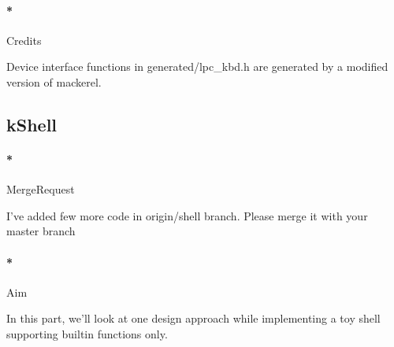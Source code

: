 \documentclass[]{article}
\newenvironment{Shaded}{}{}
\newcommand{\ExtensionTok}[1]{{#1}}
\newcommand{\NormalTok}[1]{{#1}}
\let\oldparagraph\paragraph
\renewcommand{\paragraph}[1]{\oldparagraph{#1}\mbox{}}
\begin{document}
\paragraph*{Credits}\label{credits}

Device interface functions in generated/lpc\_kbd.h are generated by a
modified version of mackerel.

\subsection{kShell}\label{kshell}

\paragraph*{MergeRequest}\label{mergerequest-3}

I've added few more code in origin/shell branch. Please merge it with
your master branch

\begin{Shaded}
\end{Shaded}

\paragraph*{Aim}\label{aim-3}

In this part, we'll look at one design approach while implementing a toy
shell supporting builtin functions only.
\end{document}
